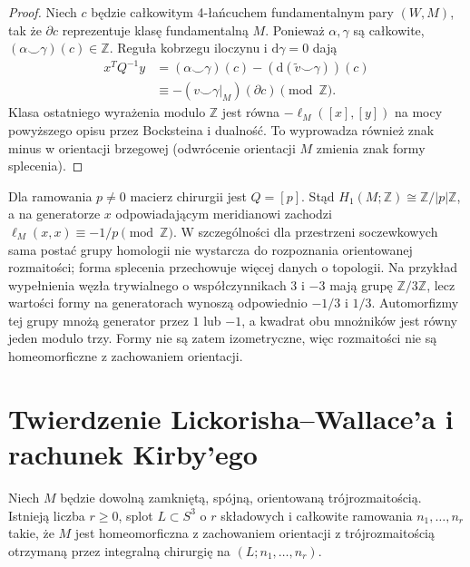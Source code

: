 \begin{proof}
Niech $c$ będzie całkowitym 4-łańcuchem fundamentalnym
pary $(W,M)$, tak że $\partial c$ reprezentuje
klasę fundamentalną $M$. Ponieważ $\alpha,\gamma$
są całkowite, $(\alpha\smile\gamma)(c)\in\mathbb Z$.
Reguła kobrzegu iloczynu i $\mathrm d\gamma=0$ dają
\[
\begin{split}
x^TQ^{-1}y
&=(\alpha\smile\gamma)(c)
-(\mathrm d(\widetilde v\smile\gamma))(c)\\
&\equiv-(v\smile\gamma|_M)(\partial c)
\pmod{\mathbb Z}.
\end{split}
\]
Klasa ostatniego wyrażenia modulo $\mathbb Z$ jest równa
$-\ell_M([x],[y])$ na mocy powyższego opisu przez
Bocksteina i dualność. To wyprowadza również znak minus
w orientacji brzegowej (odwrócenie orientacji $M$
zmienia znak formy splecenia).
\end{proof}

\begin{przyklad}
Dla ramowania $p\ne0$ macierz chirurgii jest $Q=[p]$.
Stąd $H_1(M;\mathbb Z)\cong\mathbb Z/|p|\mathbb Z$,
a na generatorze $x$ odpowiadającym meridianowi zachodzi
$\ell_M(x,x)\equiv-1/p\pmod{\mathbb Z}$.
W szczególności dla przestrzeni soczewkowych sama
postać grupy homologii nie wystarcza do rozpoznania
orientowanej rozmaitości; forma splecenia przechowuje
więcej danych o topologii. Na przykład wypełnienia
węzła trywialnego o współczynnikach $3$ i $-3$
mają grupę $\mathbb Z/3\mathbb Z$, lecz wartości formy
na generatorach wynoszą odpowiednio $-1/3$ i $1/3$.
Automorfizmy tej grupy mnożą generator przez $1$
lub $-1$, a kwadrat obu mnożników jest równy jeden
modulo trzy. Formy nie są zatem izometryczne,
więc rozmaitości nie są homeomorficzne z zachowaniem
orientacji.
\end{przyklad}


\section{Twierdzenie Lickorisha--Wallace'a i rachunek Kirby'ego}
\label{sec:kt-wallace}

\begin{twierdzenie}
Niech $M$ będzie dowolną zamkniętą, spójną, orientowaną
trójrozmaitością. Istnieją liczba $r\geq0$, splot
$L\subset S^3$ o $r$ składowych i całkowite ramowania
$n_1,\dots,n_r$ takie, że $M$ jest homeomorficzna z zachowaniem orientacji
z trójrozmaitością otrzymaną przez integralną chirurgię
na $(L;n_1,\dots,n_r)$.
\end{twierdzenie}

